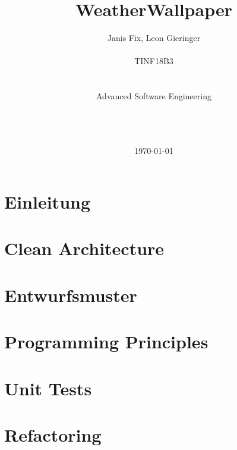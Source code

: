 \documentclass[11pt,a4paper]{article}
\title{WeatherWallpaper\vspace{20px}}
\author{Janis Fix, Leon Gieringer \\ \\ TINF18B3 \\ \\ \\ Advanced Software Engineering \\ \\ \\ \\}
\date{\today}
\begin{document}
	\maketitle
	\thispagestyle{empty}
	\newpage
	
	\tableofcontents
	\newpage
	\listoflistings
	\newpage
	
	
	\pagestyle{fancy}
	\fancyhf{}
	\setlength{\headheight}{35pt}
	\cfoot{\thepage}
	\newpage
	
	
	\section{Einleitung}
	
	\clearpage
	
	\section{Clean Architecture}
	
	\clearpage
	\section{Entwurfsmuster}
	
	\clearpage
	\section{Programming Principles}
	
	\clearpage
	\section{Unit Tests}
	
	\clearpage
	\section{Refactoring}
	
	
	
	
	
	
\end{document}
